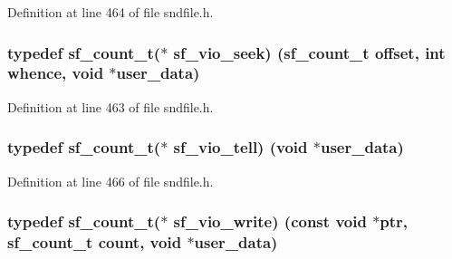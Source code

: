 Definition at line 464 of file sndfile.\+h.

\subsubsection[{\texorpdfstring{sf\+\_\+vio\+\_\+seek}{sf_vio_seek}}]{\setlength{\rightskip}{0pt plus 5cm}typedef {\bf sf\+\_\+count\+\_\+t}($\ast$ sf\+\_\+vio\+\_\+seek) ({\bf sf\+\_\+count\+\_\+t} {\bf offset}, {\bf int} whence, {\bf void} $\ast$user\+\_\+data)}\hypertarget{mac_2config_2i386_2lib-src_2libsndfile_2src_2sndfile_8h_ad23e218718c16eae24b98d41976ac5d2}{}\label{mac_2config_2i386_2lib-src_2libsndfile_2src_2sndfile_8h_ad23e218718c16eae24b98d41976ac5d2}


Definition at line 463 of file sndfile.\+h.

\subsubsection[{\texorpdfstring{sf\+\_\+vio\+\_\+tell}{sf_vio_tell}}]{\setlength{\rightskip}{0pt plus 5cm}typedef {\bf sf\+\_\+count\+\_\+t}($\ast$ sf\+\_\+vio\+\_\+tell) ({\bf void} $\ast$user\+\_\+data)}\hypertarget{mac_2config_2i386_2lib-src_2libsndfile_2src_2sndfile_8h_a457595d4cdaf505525ff421aebe6eb5d}{}\label{mac_2config_2i386_2lib-src_2libsndfile_2src_2sndfile_8h_a457595d4cdaf505525ff421aebe6eb5d}


Definition at line 466 of file sndfile.\+h.

\subsubsection[{\texorpdfstring{sf\+\_\+vio\+\_\+write}{sf_vio_write}}]{\setlength{\rightskip}{0pt plus 5cm}typedef {\bf sf\+\_\+count\+\_\+t}($\ast$ sf\+\_\+vio\+\_\+write) ({\bf const} {\bf void} $\ast$ptr, {\bf sf\+\_\+count\+\_\+t} {\bf count}, {\bf void} $\ast$user\+\_\+data)}\hypertarget{mac_2config_2i386_2lib-src_2libsndfile_2src_2sndfile_8h_aa1b1f82878422da550bfd70f2be3ded3}{}\label{mac_2config_2i386_2lib-src_2libsndfile_2src_2sndfile_8h_aa1b1f82878422da550bfd70f2be3ded3}


